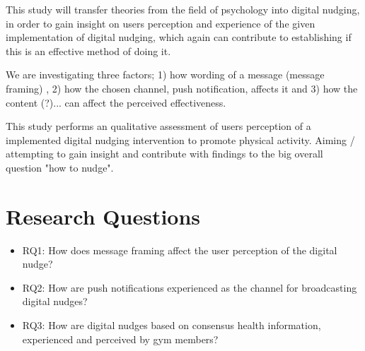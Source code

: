 
This study will transfer theories from the field of psychology into digital nudging, in order to gain insight on users perception and experience of the given implementation of digital nudging, which again can contribute to establishing if this is an effective method of doing it. 

We are investigating three factors; 1) how wording of a message (message framing) , 2) how the chosen channel, push notification, affects it and 3) how the content (?)... can affect the perceived effectiveness. 



This study performs an qualitative assessment of users perception of a implemented digital nudging intervention to promote physical activity. Aiming / attempting to gain insight and contribute with findings to the big overall question "how to nudge".

\section{Research Questions}
\begin{itemize}
\item RQ1: How does message framing affect the user perception of the digital nudge?
\item RQ2: How are push notifications experienced as the channel for broadcasting digital nudges?
\item RQ3: How are digital nudges based on consensus health information, experienced and perceived by gym members? 
\end{itemize}

